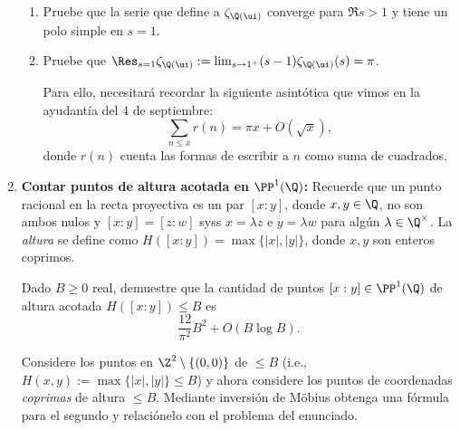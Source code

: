 \documentclass[11pt, reqno]{amsart}
\begin{document}
\begin{enumerate}
\begin{enumerate}
			\item Pruebe que la serie que define a $\zeta_{\Q(\ui)}$ converge para $\Re s > 1$ y tiene un polo simple en $s = 1$.

			\item\lookst
				Pruebe que $\Res_{s=1} \zeta_{\Q(\ui)} := \lim_{s \to 1^+} (s - 1)\zeta_{\Q(\ui)}(s) = \pi$.
				\begin{hint}
					Para ello, necesitará recordar la siguiente asintótica que vimos en la ayudantía
					 del 4 de septiembre:
					\[
						\sum_{n\le x} r(n) = \pi x + O(\sqrt{x}),
					\]
					donde $r(n)$ cuenta las formas de escribir a $n$ como suma de cuadrados.
				\end{hint}
		\end{enumerate}

		\newex
	\item\label{ex:bound_height} \lookst
		\textbf{Contar puntos de altura acotada en $\PP^1(\Q)$:}
		Recuerde que un punto racional en la recta proyectiva es un par $[x : y]$, donde $x, y \in \Q$, no son ambos nulos y $[x :
		y] = [z : w]$ syss $x = \lambda z$ e $y = \lambda w$ para algún $\lambda \in \Q^\times$.
		La \emph{altura} se define como $H([x : y]) = \max\{ |x|, |y| \}$, donde $x, y$ son enteros coprimos.

		Dado $B \ge 0$ real, demuestre que la cantidad de puntos $[x : y] \in \PP^1(\Q)$ de altura acotada $H([x : y]) \le B$ es
		$$ \frac{12}{\pi^2}B^2 + O(B \log B). $$
		\begin{hint}
			Considere los puntos en $\Z^2 \setminus \{ (0, 0) \}$ de  $\le B$ (i.e., $H(x, y) := \max\{ |x|,
			|y| \} \le B$) y ahora considere los puntos de coordenadas \emph{coprimas} de altura $\le B$.
			Mediante inversión de Möbius obtenga una fórmula para el segundo y relaciónelo con el problema del enunciado.
		\end{hint}
\end{enumerate}
\end{document}
